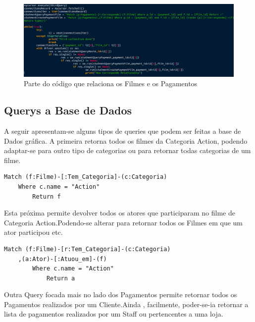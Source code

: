 \begin{figure}[H]

  \centering

  \includegraphics[width=\textwidth]{ConexaoStatment.png}

  \caption {Parte do código que relaciona os Filmes e os Pagamentos}

  \label {fig:ConexaoStatment}

\end{figure}



\subsection{Querys a Base de Dados}

A seguir apresentam-se alguns tipos de queries que podem ser feitas a base de Dados gráfica. A primeira retorna todos os filmes da Categoria Action, podendo adaptar-se para outro tipo de categorias ou para retornar todas categorias de um filme.

\begin{lstlisting}[caption=Query ao Neo4j para retornar os filmes da categoria ação]
Match (f:Filme)-[:Tem_Categoria]-(c:Categoria) 
	Where c.name = "Action" 
		Return f
\end{lstlisting}

Esta próxima permite devolver todos os atores que participaram no filme de Categoria Action.Podendo-se alterar para retornar todos os Filmes em que um ator participou etc.

\begin{lstlisting}[caption=Query ao Neo4j para retornar todos os atores que participaram em filmes de Action]
Match (f:Filme)-[r:Tem_Categoria]-(c:Categoria)
	,(a:Ator)-[:Atuou_em]-(f) 
		Where c.name = "Action" 
			Return a
\end{lstlisting}

Outra Query focada mais no lado dos Pagamentos permite retornar todos os Pagamentos realizados por um Cliente.Ainda , facilmente, poder-se-ia retornar a lista de pagamentos realizados por um Staff ou pertencentes a uma loja.

